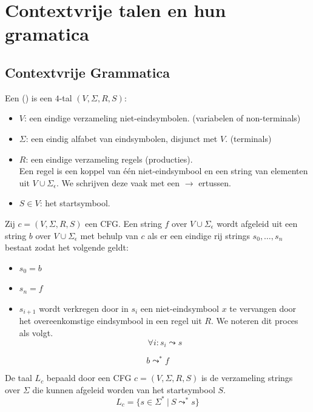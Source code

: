 \documentclass[main.tex]{subfiles}
\begin{document}
\chapter{Contextvrije talen en hun gramatica}
\label{cha:contextvrije-talen}

\section{Contextvrije Grammatica}
\label{sec:contextvrije-grammatica}


\begin{de}
  Een  () is een $4$-tal $(V,\Sigma,R,S)$:
  \begin{itemize}
  \item $V$: een eindige verzameling niet-eindsymbolen. (variabelen of non-terminals)
  \item $\Sigma$: een eindig alfabet van eindsymbolen, disjunct met $V$. (terminals)
  \item $R$: een eindige verzameling regels (producties).\\
    Een regel is een koppel van \'e\'en niet-eindsymbool en een string van elementen uit $V \cup \Sigma_{\epsilon}$. We schrijven deze vaak met een $\rightarrow$ ertussen.
  \item $S\in V$: het startsymbool.
  \end{itemize}
\end{de}

\begin{de}
  Zij $c = (V,\Sigma,R,S)$ een CFG.
  Een string $f$ over $V \cup \Sigma_{\epsilon}$ wordt afgeleid uit een string $b$ over $V \cup \Sigma_{\epsilon}$ met behulp van $c$ als er een eindige rij strings $s_{0},\dotsc,s_{n}$ bestaat zodat het volgende geldt:
  \begin{itemize}
  \item $s_{0} = b$
  \item $s_{n} = f$
  \item $s_{i+1}$ wordt verkregen door in $s_{i}$ een niet-eindsymbool $x$ te vervangen door het overeenkomstige eindsymbool in een regel uit $R$.
    We noteren dit proces als volgt.
    \[ \forall i: s_{i} \leadsto s \]
  \end{itemize}
  \[ b \leadsto^{*} f \]
\end{de}

\begin{de}
  De taal $L_{c}$ bepaald door een CFG $c = (V,\Sigma,R,S)$ is de verzameling strings over $\Sigma$ die kunnen afgeleid worden van het startsymbool $S$.
  \[ L_{c} = \{ s \in \Sigma^{*}\ |\ S \leadsto^{*} s \}
\]
\end{de}
\end{document}
